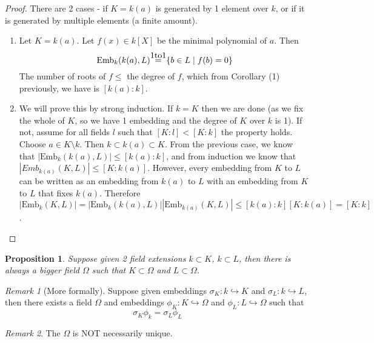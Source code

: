 \documentclass{article}
\theoremstyle{definition}
\theoremstyle{plain}%
\newtheorem{prop}[thm]{Proposition}
\theoremstyle{remark}
\newtheorem*{rem}{Remark}
\newcommand{\Emb}{\text{Emb}}
\newcommand{\onetoone}{\stackrel{\mathclap{\normalfont\mbox{1to1}}}{\;=\;}}
\begin{document}
\begin{proof}
There are 2 cases - if $K = k(a)$ is generated by 1 element over $k$, or if it is generated by multiple elements (a finite amount).
\begin{enumerate}
    \item Let $K = k(a)$. Let $f(x) \in k[X]$ be the minimal polynomial of $a$. Then \[\Emb_k(k(a), L) \onetoone \{b \in L \; | \; f(b) = 0\}\] The number of roots of $f \le$ the degree of $f$, which from Corollary (1) previously, we have is $[k(a) : k]$.
    
    \item We will prove this by strong induction. If $k = K$ then we are done (as we fix the whole of $K$, so we have 1 embedding and the degree of $K$ over $k$ is 1). If not, assume for all fields $l$ such that $[K : l] < [K : k]$ the property holds. Choose $a \in K \setminus k$. Then $k \subset k(a) \subset K$. From the previous case, we know that $|\Emb_k(k(a), L)| \le [k(a) : k]$, and from induction we know that $|Emb_{k(a)}(K, L)| \le [K : k(a)]$. However, every embedding from $K$ to $L$ can be written as an embedding from $k(a)$ to $L$ with an embedding from $K$ to $L$ that fixes $k(a)$. Therefore $|\Emb_k(K, L)| = |\Emb_k(k(a), L)||\Emb_{k(a)}(K, L)| \le [k(a) : k][K : k(a)] = [K : k]$.
\end{enumerate}
\end{proof}

\begin{prop}\label{prop 2}
Suppose given 2 field extensions $k \subset K$, $k \subset L$, then there is always a bigger field $\Omega$ such that $K \subset \Omega$ and $L \subset \Omega$.
\end{prop}

\begin{rem}[More formally]
Suppose given embeddings $\sigma_K : k \hookrightarrow K$ and $\sigma_L : k \hookrightarrow L$, then there exists a field $\Omega$ and embeddings $\phi_K : K \hookrightarrow \Omega$ and $\phi_L : L \hookrightarrow \Omega$ such that \[\sigma_K\phi_k = \sigma_L\phi_L\]
\end{rem}

\begin{rem}
The $\Omega$ is NOT necessarily unique.
\end{rem}
\end{document}

